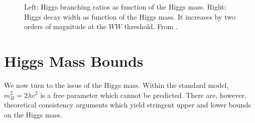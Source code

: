 \documentclass[12pt]{report}
\newcommand{\2}{\ensuremath{\sqrt{2}\,}}
\begin{document}
{      \begin{figure}[h!t]
        \begin{center}
           \hfill
        \end{center}
        \caption{\label{fig:BRH} Left: Higgs branching ratios as function of
        the Higgs mass. Right: Higgs decay width as function of the Higgs mass. It increases by 
        two orders of magnitude at the $WW$ threshold. From \cite{Spira:1997dg}.}
      \end{figure}
      

    \section{Higgs Mass Bounds}
      
      We now turn to the issue of the Higgs mass. Within the standard model, $m_H^2=2\lambda v^2$ is
      a free parameter which cannot be predicted. There are, however, theoretical consistency 
      arguments which yield stringent upper and lower bounds on the Higgs mass.
      
}
\end{document}
